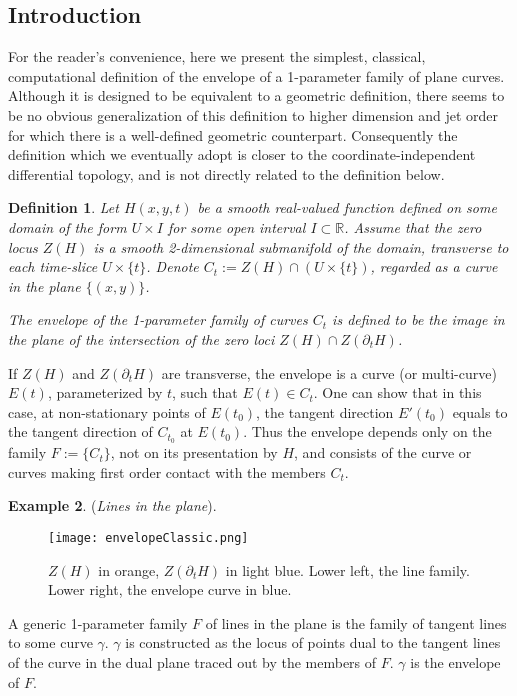 \documentclass[12pt]{article}
\numberwithin{equation}{section}
\newcounter{count}
\theoremstyle{plain}
\newtheorem{definition}{Definition}[section]
\theoremstyle{definition}
\newtheorem{example}[definition]{Example}
\newcommand{\R}{\mathbb{R}}
\begin{document}
\subsection{Introduction}
For the reader's convenience, here we present the simplest, classical, computational definition of the envelope of a 1-parameter family of plane curves. Although it is designed to be equivalent to a geometric definition, there seems to be no obvious generalization of this definition to higher dimension and jet order for which there is a well-defined geometric counterpart. Consequently the definition which we eventually adopt is closer to the coordinate-independent differential topology, and is not directly related to the definition below.
\begin{definition}\label{classicenv} Let $H(x,y,t)$ be a smooth real-valued function defined on some domain of the form $U\times I$ for some open interval $I\subset \R$. Assume that the zero locus $Z(H)$ is a smooth 2-dimensional submanifold of the domain, transverse to each time-slice $U\times \{t\}$. Denote $C_{t}:=Z(H)\cap(U\times \{t\})$, regarded as a curve in the plane $\{(x,y)\}$.

The \emph{envelope} of the 1-parameter family of curves $C_{t}$ is defined to be the image in the plane of the intersection of the zero loci $Z(H)\cap Z(\partial_{t}H)$.
\end{definition}

If $Z(H)$ and $Z(\partial_{t}H)$ are transverse, the envelope is a curve (or multi-curve) $E(t)$, parameterized by $t$, such that $E(t)\in C_t$. One can show that in this case, at non-stationary points of $E(t_{0})$, the tangent direction $E'(t_0)$ equals to the tangent direction of $C_{t_{0}}$ at $E(t_{0})$. Thus the envelope depends only on the family $F:=\{C_{t}\}$, not on its presentation by $H$, and consists of the curve or curves making first order contact with the members $C_{t}$.

\begin{example} (\emph{Lines in the plane}).
\begin{figure}[H]
 \centering
   \texttt{[image: envelopeClassic.png]}
   \caption{$Z(H)$ in orange, $Z(\partial_{t}H)$ in light blue. Lower left, the line family. Lower right, the envelope curve in blue.}
\end{figure}
A generic 1-parameter family $F$ of lines in the plane is the family of tangent lines to some curve $\gamma$. $\gamma$ is constructed as the locus of points dual to the tangent lines of the curve in the dual plane traced out by the members of $F$. $\gamma$ is the envelope of $F$.
\end{example}
\end{document}
